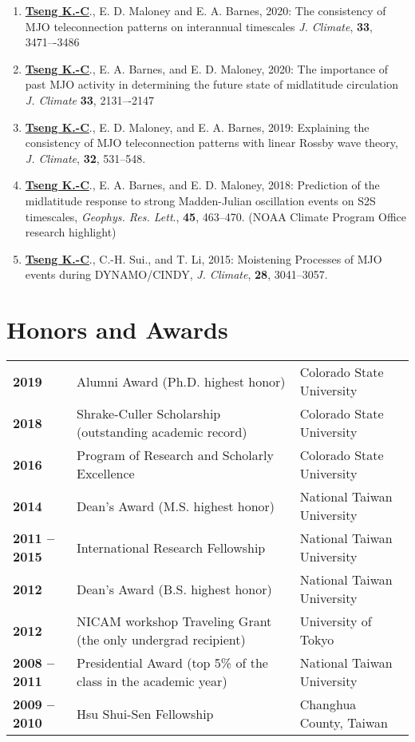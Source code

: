 \documentclass{article}
\begin{document}
\begin{enumerate}
	\item \normalsize{\bf{\underline{Tseng K.-C}}}., E. D. Maloney and E. A. Barnes, 2020: The consistency of MJO teleconnection patterns on interannual timescales \textit{J. Climate}, \normalsize{\bf{33}}, 3471–-3486
	\item \normalsize{\bf{\underline{Tseng K.-C}}}., E. A. Barnes, and E. D. Maloney, 2020: The importance of past MJO activity in determining the future state of midlatitude circulation  \textit{J. Climate} \normalsize{\bf{33}}, 2131–-2147
	\item \normalsize{\bf{\underline{Tseng K.-C}}}., E. D. Maloney, and E. A. Barnes, 2019: Explaining the consistency of MJO teleconnection patterns with linear Rossby wave theory, \textit{J. Climate}, \normalsize{\bf{32}}, 531--548.
	\item \normalsize{\bf{\underline{Tseng K.-C}}}., E. A. Barnes, and E. D. Maloney, 2018: Prediction of the midlatitude response to strong Madden-Julian oscillation events on S2S timescales, \textit{Geophys. Res. Lett}., \normalsize{\bf{45}}, 463--470. (NOAA Climate Program Office research highlight)\par
	\item \normalsize{\bf{\underline{Tseng K.-C}}}., C.-H. Sui., and T. Li, 2015: Moistening Processes of MJO events during DYNAMO/CINDY, \textit{J. Climate}, \normalsize{\bf{28}}, 3041--3057.
    \end{enumerate}


\section{\color{airforceblue}Honors and Awards}
\begin{tabular}{>{\bfseries}p{2.5cm}p{10cm}p{\linewidth-2.5cm\relax}}
     2019   & Alumni Award (Ph.D. highest honor) & Colorado State University 
     \\
     2018   & Shrake-Culler Scholarship (outstanding academic record) & Colorado State University 
     \\  
	 2016   & Program of Research and Scholarly Excellence & Colorado State University 
	 \\
     2014  & Dean’s Award (M.S. highest honor) & National Taiwan University 
     \\
     2011 -- 2015 & International Research Fellowship & National Taiwan University 
     \\
     2012        & Dean’s Award (B.S. highest honor) & National Taiwan University  
     \\
     2012        & NICAM workshop Traveling Grant (the only undergrad recipient)   & University of Tokyo
     \\  
     2008 -- 2011 & Presidential Award (top 5\% of the class in the academic year) & National Taiwan University 
     \\

     2009 -- 2010 & Hsu Shui-Sen Fellowship   & Changhua County, Taiwan 
     
\end{tabular}
\end{document}
